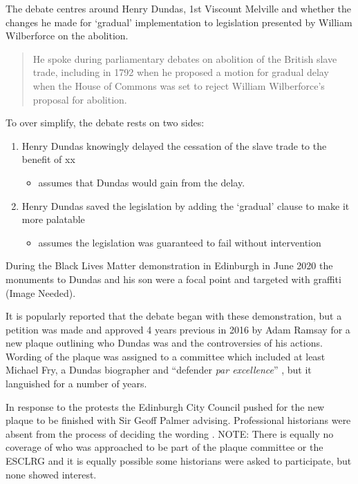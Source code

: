 \documentclass{scrartcl}
\begin{document}
The debate centres around Henry Dundas, 1st Viscount Melville and whether the changes he made for `gradual' implementation to legislation presented by William Wilberforce on the abolition.

\begin{quotation}
    He spoke during parliamentary debates on abolition of the British slave trade, including in 1792 when he proposed a motion for gradual delay when the House of Commons was set to reject William Wilberforce’s proposal for abolition. 
\end{quotation}
\cite{mullen_2021}

To over simplify, the debate rests on two sides:

\begin{enumerate}
    \item Henry Dundas knowingly delayed the cessation of the slave trade to the benefit of xx
    \begin{itemize}
        \item assumes that Dundas would gain from the delay.
    \end{itemize}
    \item Henry Dundas saved the legislation by adding the `gradual' clause to make it more palatable 
    \begin{itemize}
        \item assumes the legislation was guaranteed to fail without intervention
    \end{itemize}
\end{enumerate}

During the Black Lives Matter demonstration in Edinburgh in June 2020 the monuments to Dundas and his son were a focal point and targeted with graffiti (Image Needed). 

It is popularly reported that the debate began with these demonstration, but a petition was made and approved 4 years previous in 2016 by Adam Ramsay \cite{mullen_2021} for a new plaque outlining who Dundas was and the controversies of his actions. Wording of the plaque was assigned to a committee which included at least Michael Fry, a Dundas biographer and ``defender \textit{par excellence}'' \cite{mccarthy_2022_1}, but it languished for a number of years.

In response to the protests the Edinburgh City Council pushed for the new plaque to be finished with Sir Geoff Palmer advising. Professional historians were absent from the process of deciding the wording \cite{scotsman_2022}. NOTE: There is equally no coverage of who was approached to be part of the plaque committee or the ESCLRG and it is equally possible some historians were asked to participate, but none showed interest.
\end{document}
